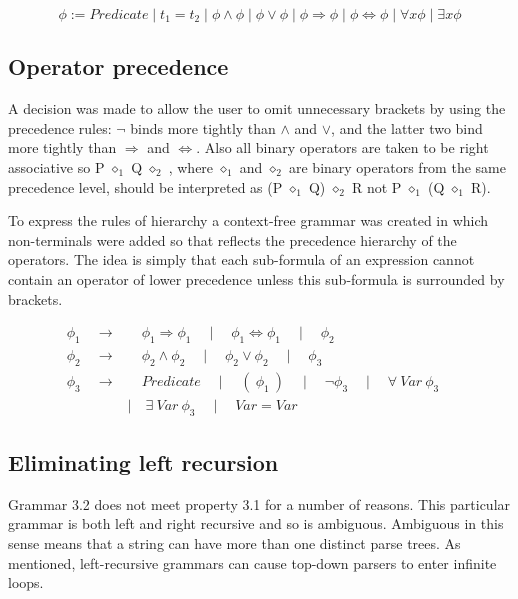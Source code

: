 $$ \phi := Predicate \mid t_1 = t_2 \mid \phi \land \phi \mid \phi \lor \phi \mid \phi \Rightarrow \phi \mid \phi \Leftrightarrow \phi \mid \forall x \phi \mid \exists x \phi$$


\subsection{Operator precedence}

A decision was made to allow the user to omit unnecessary brackets by using the precedence rules: $\lnot$ binds more tightly than $\land$ and $\lor$, and the latter two bind more tightly than $\Rightarrow$ and $\Leftrightarrow$. Also all binary operators are taken to be right associative so P $\diamond_1$ Q $\diamond_2$ , where $\diamond_1$ and $\diamond_2$ are binary operators from the same precedence level, should be interpreted as (P $\diamond_1$ Q) $\diamond_2$ R  not P $\diamond_1$ (Q $\diamond_1$ R).  

To express the rules of hierarchy a context-free grammar was created  in which non-terminals were added so that reflects the precedence hierarchy of the operators. The idea is simply that each sub-formula of an expression cannot contain an operator of lower precedence unless this sub-formula is surrounded by brackets. 

\begin{equation}
\begin{aligned}
\phi_1 \quad \to& \quad \phi_1 \Rightarrow \phi_1 \quad
\mid \quad \phi_1 \Leftrightarrow \phi_1 \quad
\mid \quad \phi_2
\\
\phi_2 \quad \to& \quad \phi_2 \land \phi_2 \quad 
\mid \quad \phi_2 \lor \phi_2 \quad 
\mid \quad \phi_3 
\\
\phi_3 \quad \to& \quad Predicate \quad
\mid \quad ( \: \phi_1 \: ) \quad
\mid \quad \lnot \phi_3 \quad
\mid \quad \forall \: Var \: \phi_3 \quad
\\ &\mid \quad \exists \: Var \:\phi_3 \quad
\mid \quad Var = Var 
\end{aligned}
\end{equation}
\subsection{Eliminating left recursion}
Grammar 3.2 does not meet property 3.1 for a number of reasons. This particular grammar is both left and right recursive and so is ambiguous. Ambiguous in this sense means that a string can  have more than one distinct parse trees. As mentioned, left-recursive grammars can cause  top-down parsers to enter infinite loops.

